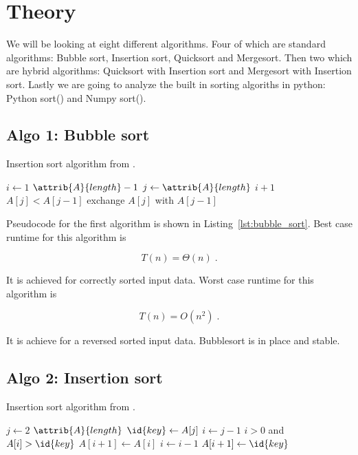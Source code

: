 \documentclass[twocolumn, sigconf, nonacm, natbib, screen, balance=False]{acmart}
\begin{document}
\section{Theory}\label{sec:theory}

We will be looking at eight different algorithms. Four of which are standard algorithms: Bubble sort, Insertion sort, Quicksort and Mergesort. Then two which are hybrid algorithms: Quicksort with Insertion sort and Mergesort with Insertion sort. Lastly we are going to analyze the built in sorting algoriths in python: Python sort() and Numpy sort().

\subsection{Algo 1: Bubble sort}\label{sec:algo1}

\begin{listing}
  \caption{Insertion sort algorithm from \citet[Ch.~2.1]{CLRS_2009}.}
  \label{lst:bubble_sort}
  \begin{codebox}
    \li \For $i \gets 1$ \To $\attrib{A}{length} - 1$
    \li \Do \For $j \gets \attrib{A}{length}$ \Downto $i + 1$
    \li 	\Do \If $A[j] < A[j - 1]$
    \li         \Then exchange $A[j]$ with $A[j - 1]$
    \End    
    \End
    \End
  \end{codebox}
\end{listing}

Pseudocode for the first algorithm is shown in
Listing~\ref{lst:bubble_sort}. Best case runtime for this algorithm
is

\begin{equation}
  T(n) = \Theta(n) \;.  \label{eq:bub_sort_best}
\end{equation}

It is achieved for correctly sorted input data. Worst case runtime for this algorithm is

\begin{equation}
  T(n) = O(n^2) \;.  \label{eq:bub_sort_worst}
\end{equation}

It is achieve for a reversed sorted input data. Bubblesort is in place and stable.

\subsection{Algo 2: Insertion sort}\label{sec:algo2}

\begin{listing}
  \caption{Insertion sort algorithm from \citet[Ch.~2.1]{CLRS_2009}.}
  \label{lst:insertion_algo}
  \begin{codebox}
    \li \For $j \gets 2$ \To $\attrib{A}{length}$
    \li \Do
    $\id{key} \gets A[j]$
    \li     $i \gets j-1$
    \li      \While $i>0$ and $A[i] > \id{key}$
    \li      \Do
    $A[i+1] \gets A[i]$
    \li         $i \gets i-1$
    \End    
    \li       $A[i+1]\gets \id{key}$
    \End
  \end{codebox}
\end{listing}
\end{document}
